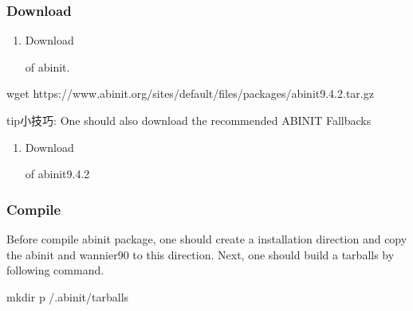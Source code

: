 \documentclass[a4paper,12pt,english]{sphinxmanual}
\begin{document}
\subsubsection{Download}
\label{\detokenize{compile/abinit_9.4.2:download}}\begin{enumerate}
%
\item {} 
\sphinxAtStartPar
Download %
\begin{footnote}[7]\sphinxAtStartFootnote
{}
%
\end{footnote} of abinit.

\end{enumerate}

\begin{sphinxVerbatim}[commandchars=\\\{\}]
wget https://www.abinit.org/sites/default/files/packages/abinit\PYGZhy{}9.4.2.tar.gz
\end{sphinxVerbatim}

\begin{sphinxadmonition}{tip}{小技巧:}
\sphinxAtStartPar
One should also download the recommended ABINIT Fallbacks
\end{sphinxadmonition}
\begin{enumerate}
%
\item {} 
\sphinxAtStartPar
Download %
\begin{footnote}[8]\sphinxAtStartFootnote
{}
%
\end{footnote} of abinit\sphinxhyphen{}9.4.2

\end{enumerate}


\subsubsection{Compile}
\label{\detokenize{compile/abinit_9.4.2:compile}}
\sphinxAtStartPar
Before compile abinit package, one should create a installation direction and copy the abinit and wannier90 to this direction. Next, one should build a tarballs by following command.

\begin{sphinxVerbatim}[commandchars=\\\{\}]
mkdir \PYGZhy{}p \PYGZti{}/.abinit/tarballs
\end{sphinxVerbatim}
\end{document}
